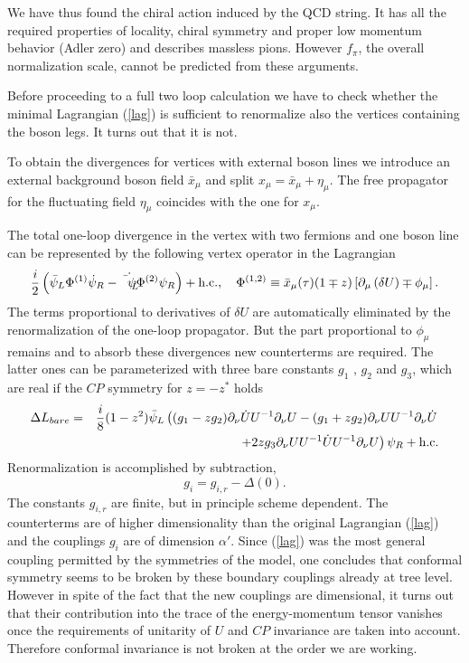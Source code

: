 \documentclass[a4paper,12pt]{article}
\begin{document}
We have thus found the chiral action induced by the QCD string.
It has all the required properties of locality, chiral symmetry 
and proper low momentum behavior (Adler zero) and describes
massless pions. However $f_\pi$, the overall normalization scale, cannot be
predicted from these arguments. 

Before proceeding to a full two loop calculation we have to check whether 
the minimal
Lagrangian (\ref{lag}) is sufficient to renormalize also the vertices containing
the boson legs.  It turns out that it is not.

To obtain the divergences for vertices with external boson lines
we introduce an external background boson field $\bar x_\mu $ 
and split $ x_\mu =  \bar x_\mu + \eta_\mu $. 
The free propagator 
for the fluctuating field $\eta_\mu $ coincides with the one for  $x_\mu $.

The  total one-loop divergence in the vertex with two fermions and 
one boson line can be represented by the following
vertex 
operator in the Lagrangian
\begin{equation}
\frac{i}{2}\left( \bar\psi_L\Phi^{(1)}\dot\psi_R -\dot{\bar\psi_L}\Phi^{(2)}
\psi_R\right)+ \mbox{\rm h.c.},\quad 
\Phi^{(1,2)} \equiv \bar x_\mu(\tau)(1\mp z)\left[  
\partial_{\mu}\left(\delta U\right)\mp\phi_\mu\right].\label{adddiv}
\end{equation}
The terms proportional to derivatives of $\delta U$ 
are automatically eliminated by the renormalization of
 the one-loop propagator. 
But the part proportional to $\phi _\mu$ remains and to absorb 
these divergences new counterterms are required. The latter ones 
can be parameterized with three bare 
constants $g_1$ , $g_2$ and $g_3$, which are real 
if the $CP$ symmetry for $z = - z^*$ holds
\begin{eqnarray}
\Delta L_{bare}&= &\frac{i}{8} (1 - z^2)\bar\psi_L\left( 
(g_1 - z g_2) \partial_\nu \dot{U} U^{-1}\partial_\nu U 
- (g_1 + z g_2) \partial_\nu U U^{-1}\partial_\nu \dot{U} \right.\nonumber\\
&&\left.+  2z g_3 \partial_\nu U U^{-1} \dot{U} U^{-1} \partial_\nu U 
\right)\psi_R  + \mbox{\rm h.c.} \label{count}
\end{eqnarray} 
Renormalization is accomplished by subtraction,
\begin{equation}
g_i = g_{i,r} - \Delta(0). \label{gren}
\end{equation}
The constants $g_{i,r}$ are finite, but in principle scheme dependent.
The counterterms are of  higher dimensionality than 
the original Lagrangian (\ref{lag}) and the couplings $g_i$ are 
of dimension $\alpha'$. Since (\ref{lag}) was the most 
general coupling permitted by the symmetries of the model, one concludes that
conformal symmetry seems to be broken by these boundary couplings 
already at tree level. 
However in spite of the fact that 
the new couplings are dimensional, it turns out \cite{aabe} that 
their contribution into the trace of the energy-momentum tensor 
vanishes once the requirements of unitarity of $U$ and $CP$ invariance are 
taken into account. Therefore conformal invariance is not broken 
at the order
we are working. 
\end{document}
